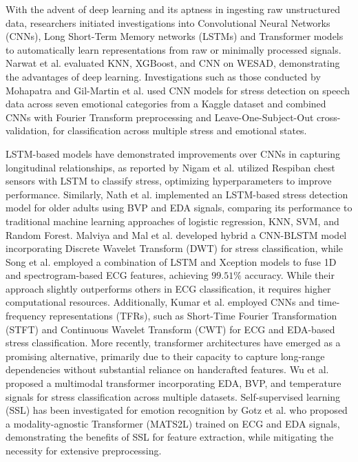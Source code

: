 With the advent of deep learning and its aptness in ingesting raw unstructured data, researchers initiated investigations into Convolutional Neural Networks (CNNs), Long Short-Term Memory networks (LSTMs) and Transformer models to automatically learn representations from raw or minimally processed signals. Narwat et al. \cite{10463214} evaluated KNN, XGBoost, and CNN on WESAD, demonstrating the advantages of deep learning. Investigations such as those conducted by Mohapatra \cite{9964761} and Gil-Martin et al. \cite{9669993} used CNN models for stress detection on speech data across seven emotional categories from a Kaggle dataset and combined CNNs with Fourier Transform preprocessing and Leave-One-Subject-Out cross-validation, for classification across multiple stress and emotional states. 


LSTM-based models have demonstrated improvements over CNNs in capturing longitudinal relationships, as reported by Nigam et al. \cite{nigam2021improved} utilized Respiban chest sensors with LSTM to classify stress, optimizing hyperparameters to improve performance. Similarly, Nath et al. \cite{nath2022machine} implemented an LSTM-based stress detection model for older adults using BVP and EDA signals, comparing its performance to  traditional machine learning approaches of logistic regression, KNN, SVM, and Random Forest. Malviya and Mal et al. \cite{malviya2022novel} developed hybrid a CNN-BLSTM model incorporating Discrete Wavelet Transform (DWT) for stress classification, while Song et al. \cite{song2024stress} employed a combination of LSTM and Xception models to fuse 1D and spectrogram-based ECG features, achieving $99.51\%$ accuracy. While their approach slightly outperforms others in ECG classification, it requires higher computational resources. Additionally, Kumar et al. \cite{kumar2024deep} employed CNNs and time-frequency representations (TFRs), such as Short-Time Fourier Transformation (STFT) and Continuous Wavelet Transform (CWT) for ECG and EDA-based stress classification. More recently, transformer architectures have emerged as a promising alternative, primarily due to their capacity to capture long-range dependencies without substantial reliance on handcrafted features. Wu et al. \cite{wu2023transformer} proposed a multimodal transformer incorporating EDA, BVP, and temperature signals for stress classification across multiple datasets. Self-supervised learning (SSL) has been investigated for emotion recognition by Gotz et al. \cite{gotz2023self} who proposed a modality-agnostic Transformer (MATS2L) trained on ECG and EDA signals, demonstrating the benefits of SSL for feature extraction, while mitigating the necessity for extensive preprocessing.

